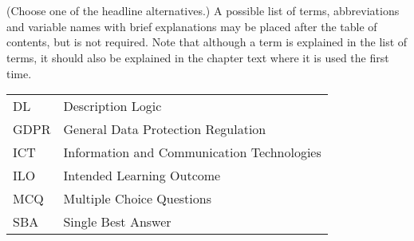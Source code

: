 \section*{}\label{sec:terminology}
{}
(Choose one of the headline alternatives.) 
A possible list of terms, abbreviations and variable names with brief
explanations may be placed after the table of contents, but is not required.
Note that although a term is explained in the list of terms, it should also be
explained in the chapter text where it is used the first time.

\begin{table}[ht!]
  \begin{tabular}{l l}
DL & Description Logic\\
GDPR & General Data Protection Regulation\\
ICT & Information and Communication Technologies\\
ILO & Intended Learning Outcome\\
MCQ & Multiple Choice Questions\\
SBA & Single Best Answer\\
\end{tabular}
\end{table}
